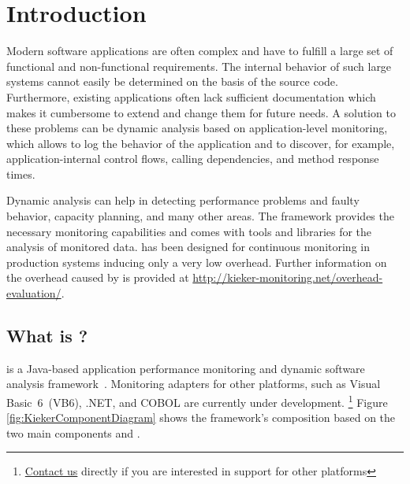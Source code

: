 %


\chapter{Introduction}\label{chap:introduction}

Modern software applications are often complex and have to fulfill a large set of functional and non-functional requirements. The internal behavior of such large systems cannot easily be determined on the basis of the source code. Furthermore, existing applications often lack sufficient documentation which makes it cumbersome to extend and change them for future needs. A solution to these problems can be dynamic analysis based on application-level monitoring, which allows to log the behavior of the application and to discover, for example, application-internal control flows, calling dependencies, and method response times.

Dynamic analysis can help in detecting performance problems and faulty behavior, capacity planning, and many other areas. The \Kieker{} framework provides the necessary monitoring capabilities and comes with tools and libraries for the analysis of monitored data. \Kieker{} has been designed for %
continuous monitoring in production systems inducing only a very low overhead. Further information on the overhead caused by \Kieker{} is provided at \url{http://kieker-monitoring.net/overhead-evaluation/}.

\section{What is \Kieker?}\label{sec:kieker}

\enlargethispage{1cm}

\Kieker{} is a Java-based application performance monitoring and dynamic software analysis framework~\cite{KiekerICPE2012}. %
Monitoring adapters for other platforms, such as Visual Basic~6~(VB6), .NET, and COBOL are currently under development.%
\footnote{\href{http://kieker-monitoring.net/support}{Contact us} directly if you are interested in \Kieker{} support for other platforms} %
Figure \ref{fig:KiekerComponentDiagram} shows the framework's composition based %
on the two main components \KiekerMonitoringPart{} and \KiekerAnalysisPart{}. %

